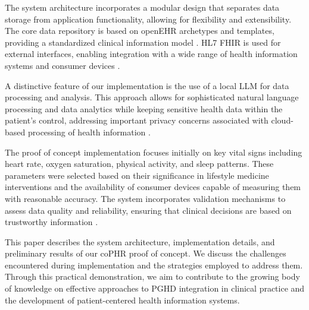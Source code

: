 The system architecture incorporates a modular design that separates data storage from application functionality, allowing for flexibility and extensibility. The core data repository is based on openEHR archetypes and templates, providing a standardized clinical information model \cite{silva2024openehr}. HL7 FHIR is used for external interfaces, enabling integration with a wide range of health information systems and consumer devices \cite{lichtner2023representation}.

A distinctive feature of our implementation is the use of a local LLM for data processing and analysis. This approach allows for sophisticated natural language processing and data analytics while keeping sensitive health data within the patient's control, addressing important privacy concerns associated with cloud-based processing of health information \cite{balch2023machine}.

The proof of concept implementation focuses initially on key vital signs including heart rate, oxygen saturation, physical activity, and sleep patterns. These parameters were selected based on their significance in lifestyle medicine interventions and the availability of consumer devices capable of measuring them with reasonable accuracy. The system incorporates validation mechanisms to assess data quality and reliability, ensuring that clinical decisions are based on trustworthy information \cite{beale2021decision}.

This paper describes the system architecture, implementation details, and preliminary results of our coPHR proof of concept. We discuss the challenges encountered during implementation and the strategies employed to address them. Through this practical demonstration, we aim to contribute to the growing body of knowledge on effective approaches to PGHD integration in clinical practice and the development of patient-centered health information systems.
